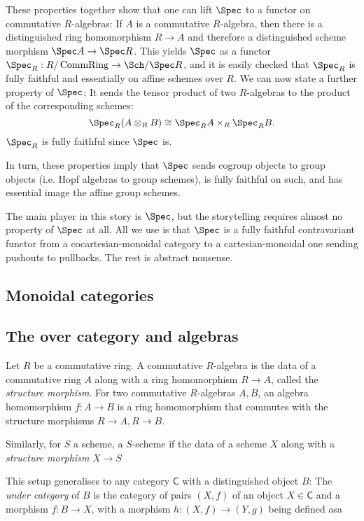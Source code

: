 \documentclass{article}
\DeclareMathOperator{\CommRing}{CommRing}
\begin{document}
These properties together show that one can lift $\Spec$ to a functor on commutative $R$-algebras:
If $A$ is a commutative $R$-algebra, then there is a distinguished ring homomorphism $R \to A$
and therefore a distinguished scheme morphism $\Spec A \to \Spec R$.
This yields $\Spec$ as a functor $\Spec_R : R / \CommRing \to \Sch / \Spec R$,
and it is easily checked that $\Spec_R$ is fully faithful and essentially on affine schemes over $R$.
We can now state a further property of $\Spec$:
It sends the tensor product of two $R$-algebras to the product of the corresponding schemes:
\[
\Spec_R (A \otimes_R B) \cong \Spec_R A \times_R \Spec_R B.
\]
$\Spec_R$ is fully faithful since $\Spec$ is.

In turn, these properties imply that $\Spec$ sends cogroup objects to group objects
(i.e. Hopf algebras to group schemes), is fully faithful on such,
and has essential image the affine group schemes.

The main player in this story is $\Spec$,
but the storytelling requires almost no property of $\Spec$ at all.
All we use is that $\Spec$ is a fully faithful contravariant functor
from a cocartesian-monoidal category to a cartesian-monoidal one sending pushouts to pullbacks.
The rest is abstract nonsense.


\subsection{Monoidal categories}


\subsection{The over category and algebras}


Let $R$ be a commutative ring.
A commutative $R$-algebra is the data of a commutative ring $A$ along with a ring homomorphism
$R \to A$, called the \emph{structure morphism}.
For two commutative $R$-algebras $A, B$,
an algebra homomorphism $f : A \to B$ is a ring homomorphism that commutes
with the structure morphisms $R \to A, R \to B$.

Similarly, for $S$ a scheme, a $S$-scheme if the data of a scheme $X$ along with a
\emph{structure morphism} $X \to S$

This setup generalises to any category $\mathsf C$ with a distinguished object $B$:
The \emph{under category} of $B$ is the category of pairs $(X, f)$ of an object $X \in \mathsf C$
and a morphism $f : B \to X$, with a morphism $h : (X, f) \to (Y, g)$ being defined asa
\end{document}
